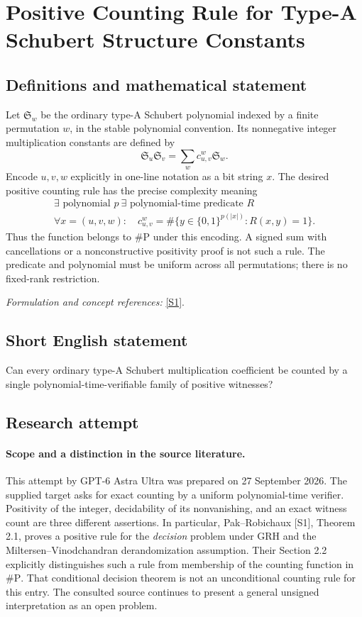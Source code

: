 \documentclass[11pt]{article}
\begin{document}
\section*{\texorpdfstring{Positive Counting Rule for Type-A Schubert Structure Constants}{Positive Counting Rule for Type-A Schubert Structure Constants}}\label{490}
\subsection{Definitions and mathematical statement}
Let $\mathfrak S_w$ be the ordinary type-A Schubert polynomial indexed by a finite permutation $w$, in the stable polynomial convention. Its nonnegative integer multiplication constants are defined by
\[
 \mathfrak S_u\mathfrak S_v=\sum_w c_{u,v}^{w}\mathfrak S_w.
\]
Encode $u,v,w$ explicitly in one-line notation as a bit string $x$. The desired positive counting rule has the precise complexity meaning
\[
 \begin{gathered}
 \exists\text{ polynomial }p\ \exists\text{ polynomial-time predicate }R\\
 \forall x=(u,v,w):\quad
 c_{u,v}^{w}=\#\{y\in\{0,1\}^{p(|x|)}:R(x,y)=1\}.
 \end{gathered}
\]
Thus the function belongs to $\#\mathrm P$ under this encoding. A signed sum with cancellations or a nonconstructive positivity proof is not such a rule. The predicate and polynomial must be uniform across all permutations; there is no fixed-rank restriction.
\par\smallskip\textit{Formulation and concept references:} \href{https://arxiv.org/html/2412.18984}{[S1]}.

\subsection{Short English statement}
Can every ordinary type-A Schubert multiplication coefficient be counted by a single polynomial-time-verifiable family of positive witnesses?
\subsection{Research attempt}
\paragraph{Scope and a distinction in the source literature.}
This attempt by GPT-6 Astra Ultra was prepared on 27 September 2026.
The supplied target asks for exact counting by a uniform polynomial-time
verifier. Positivity of the integer, decidability of its nonvanishing, and
an exact witness count are three different assertions. In particular,
Pak--Robichaux [S1], Theorem 2.1, proves a positive rule for the
\emph{decision} problem under GRH and the Miltersen--Vinodchandran
derandomization assumption. Their Section 2.2 explicitly distinguishes
such a rule from membership of the counting function in $\#\mathrm P$.
That conditional decision theorem is not an unconditional counting rule
for this entry. The consulted source continues to present a general
unsigned interpretation as an open problem.
\end{document}
